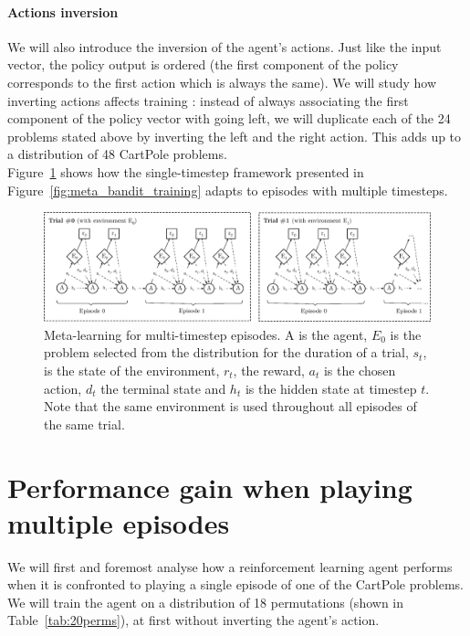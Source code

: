 \paragraph{Actions inversion} We will also introduce the inversion of the
agent's actions. Just like the input vector, the policy output is ordered
(the first component of the policy corresponds to the first action which is
always the same). We will study how inverting actions affects training : instead
of always associating the first component of the policy vector with going left,
we will duplicate each of the 24 problems stated above by inverting the left
and the right action. This adds up to a distribution of 48 CartPole problems.\\

Figure~\ref{fig:meta_cartpole} shows how the single-timestep framework
presented in Figure~\ref{fig:meta_bandit_training} adapts to episodes
with multiple timesteps.

\begin{figure}[H]
	\centering
	\includegraphics[width=\linewidth]{fig/meta_cartpole.eps}
	\caption{Meta-learning for multi-timestep episodes. A is the agent,
	$E_0$ is the problem selected from the distribution for the duration
	of a trial, $s_t$, is the state of the environment, $r_t$, the reward,
	$a_t$ is the chosen action, $d_t$ the terminal state and $h_t$ is
	the hidden state at timestep $t$. Note that the same environment is
	used throughout all episodes of the same trial.}
	\label{fig:meta_cartpole}
\end{figure}

\section{Performance gain when playing multiple episodes}

We will first and foremost analyse how a reinforcement learning agent 
performs when it is confronted to playing a single episode of one of the 
CartPole problems. We will train the agent on a distribution of 18 permutations
(shown in Table~\ref{tab:20perms}), at first without inverting the agent's
action.\\

